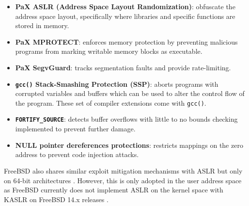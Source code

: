 \begin{itemize}
	\item \textbf{PaX ASLR (Address Space Layout Randomization)}: obfuscate the address space layout, specifically where libraries
	      and specific functions are stored in memory.

	\item \textbf{PaX MPROTECT}: enforces memory protection by preventing malicious programs from marking writable memory blocks
	      as executable.

	\item \textbf{PaX SegvGuard}: tracks segmentation faults and provide rate-limiting.

	\item \textbf{\texttt{gcc()} Stack-Smashing Protection (SSP)}: aborts programs with corrupted variables and buffers which can be
	      used to alter the control flow of the program. These set of compiler extensions come with \texttt{gcc()}.

	\item \textbf{\texttt{FORTIFY\_SOURCE}}: detects buffer overflows with little to no bounds checking implemented to prevent
	      further damage.

	\item \textbf{NULL pointer dereferences protections}: restricts mappings on the zero address to prevent code injection
	      attacks.
\end{itemize}

\noindent
FreeBSD also shares similar exploit mitigation mechanisms with ASLR but only on 64-bit architectures \parencite{larabel2022}.
However, this is only adopted in the user address space as FreeBSD currently does not implement ASLR on the kernel space with
KASLR on FreeBSD 14.x releases \parencite{belousov_maste}.

